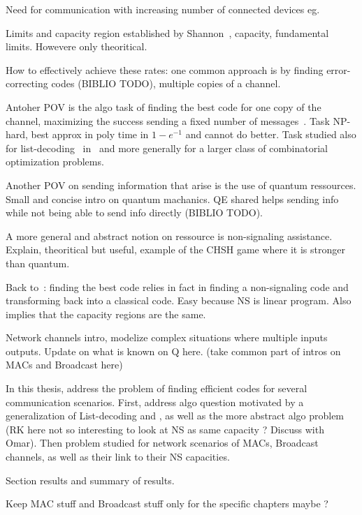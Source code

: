 Need for communication with increasing number of connected devices eg.

Limits and capacity region established by Shannon~\cite{Shannon48}, capacity, fundamental limits. Howevere only theoritical.

How to effectively achieve these rates: one common approach is by finding error-correcting codes (BIBLIO TODO), multiple copies of a channel.

Antoher POV is the algo task of finding the best code for one copy of the channel, maximizing the success sending a fixed number of messages~\cite{BF18}. Task NP-hard, best approx in poly time in $1-e^{-1}$ and cannot do better. Task studied also for list-decoding~\cite{Elias57,Wozencraft58} in~\cite{BFGG20} and more generally for a larger class of combinatorial optimization problems.

Another POV on sending information that arise is the use of quantum ressources. Small and concise intro on quantum machanics. QE shared helps sending info while not being able to send info directly (BIBLIO TODO).

A more general and abstract notion on ressource is non-signaling assistance. Explain, theoritical but useful, example of the CHSH game where it is stronger than quantum.

Back to~\cite{BF18}: finding the best code relies in fact in finding a non-signaling code and transforming back into a classical code. Easy because NS is linear program. Also implies that the capacity regions are the same.

Network channels intro, modelize complex situations where multiple inputs outputs. Update on what is known on Q here. (take common part of intros on MACs and Broadcast here)

In this thesis, address the problem of finding efficient codes for several communication scenarios. First, address algo question motivated by a generalization of List-decoding and \cite{BFGG20}, as well as the more abstract algo problem (RK here not so interesting to look at NS as same capacity ? Discuss with Omar). Then problem studied for network scenarios of MACs, Broadcast channels, as well as their link to their NS capacities.

Section results and summary of results.

Keep MAC stuff and Broadcast stuff only for the specific chapters maybe ?
